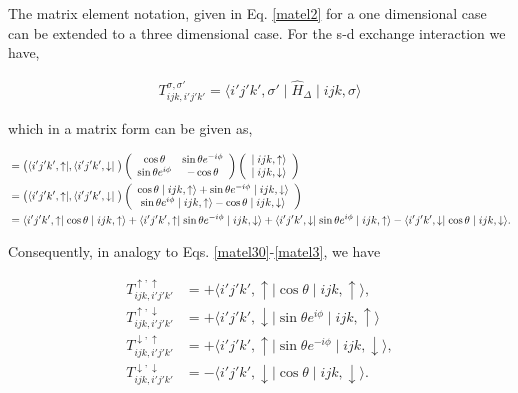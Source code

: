 \documentclass[10pt,prb,showpacs,amssymb,floatfix]{revtex4-1}
\newcommand{\Dlt}{\Delta}
\begin{document}
The matrix element notation, given in Eq.  \eqref{matel2} for a one dimensional case can be extended to a three dimensional case. For the s-d exchange interaction we have, 

\begin{align}
T_{ijk,i'j'k'}^{\sigma,\sigma'} = \langle i'j'k',\sigma' \mid \hat{H}_{\Dlt} \mid ijk, \sigma \rangle
\end{align}

which in a matrix form can be given as,

\begin{align}
&=  \big{(} \langle i'j'k',\uparrow \mid , \langle i'j'k',\downarrow \mid \big{)} \left(\begin{array}{cc} 
\cos\theta &  \sin\theta e^{-i\phi}\\
 \sin\theta e^{i\phi} & -\cos\theta
\end{array}\right)  \left(\begin{array}{c} 
\mid ijk,\uparrow \rangle \\
\mid ijk,\downarrow \rangle
\end{array}\right) \\
&= \big{(}\langle i'j'k',\uparrow \mid , \langle i'j'k',\downarrow \mid \big{)}  \left(\begin{array}{c} 
\cos\theta  \mid ijk,\uparrow \rangle + \sin\theta e^{-i\phi}  \mid ijk,\downarrow \rangle \\
\sin\theta e^{i\phi} \mid ijk,\uparrow \rangle - \cos\theta \mid ijk,\downarrow \rangle
\end{array}\right) \\
&= \langle i'j'k',\uparrow \mid \cos\theta \mid ijk,\uparrow \rangle + \langle i'j'k',\uparrow \mid \sin\theta e^{-i\phi} \mid ijk,\downarrow \rangle +
 \langle i'j'k',\downarrow \mid \sin\theta e^{i\phi}\mid ijk,\uparrow \rangle -  \langle i'j'k',\downarrow \mid \cos\theta\mid ijk,\downarrow \rangle.
\label{eqsd12}
\end{align}

Consequently, in analogy to Eqs. \eqref{matel30}-\eqref{matel3}, we have
 
\begin{align}
\label{eqsd1220}
T_{ijk,i'j'k'}^{\uparrow,\uparrow} &= +\langle i'j'k',\uparrow \mid \cos\theta \mid ijk,\uparrow \rangle , \\
\label{eqsd1221}
T_{ijk,i'j'k'}^{\uparrow,\downarrow} &= +\langle i'j'k',\downarrow \mid \sin\theta e^{i\phi}  \mid ijk,\uparrow \rangle \\
\label{eqsd1222}
T_{ijk,i'j'k'}^{\downarrow,\uparrow} &= +\langle i'j'k',\uparrow \mid \sin\theta e^{-i\phi} \mid ijk,\downarrow \rangle, \\
T_{ijk,i'j'k'}^{\downarrow,\downarrow} &= -\langle i'j'k',\downarrow \mid \cos\theta \mid ijk,\downarrow \rangle. 
\label{eqsd123}
\end{align}
\end{document}
